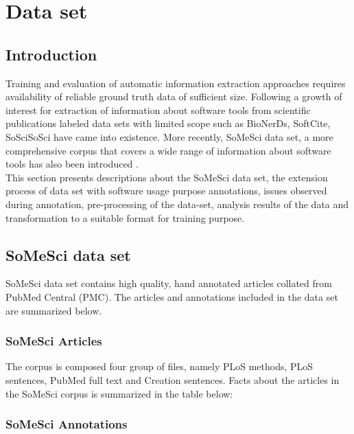 \chapter{Data set}
\label{ch:dataset}
 
%
%
\section{Introduction}
\label{sec:dataset:intro}

Training and evaluation of automatic information extraction approaches requires availability of reliable ground truth data of sufficient size. Following a growth of interest for extraction of information about software tools from scientific publications labeled data sets with limited scope such as BioNerDs, SoftCite, SoSciSoSci have came into existence. More recently, SoMeSci data set, a more comprehensive corpus that covers a wide range of information about software tools has also been introduced \citep{schindler2021somesci}. \\
 
This section presents descriptions about the SoMeSci data set, the extension process of data set with software usage purpose annotations, issues observed during annotation, pre-processing of the data-set, analysis results of the data and transformation to a suitable format for training purpose.  


\section{SoMeSci data set}
\label{sec:dataset:SoMeSci}

SoMeSci data set contains high quality, hand annotated articles collated from PubMed Central (PMC). The articles and annotations included in the data set are summarized below.  

\subsection{ SoMeSci Articles }
\label{subsec:dataset:SoMeSci:Articles}

The corpus is composed four group of files, namely PLoS methods, PLoS sentences, PubMed full text and Creation sentences. Facts about the articles in the SoMeSci corpus is summarized in the table below:

\subsection{SoMeSci Annotations  }
\label{subsec:dataset:SoMeSci:Annotations }

